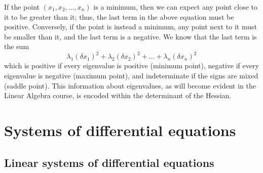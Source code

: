 \documentclass{article}
\begin{document}
If the point $(x_1, x_2, ..., x_n)$ is a minimum, then we can expect any point close to it to be greater than it; thus, the last term in the above equation must be positive. Conversely, if the point is instead a minimum, any point next to it must be smaller than it, and the last term is a negative. We know that the last term is the sum
\begin{equation*}
    \lambda_1(\delta x_1)^2+\lambda_2(\delta x_2)^2 + \dots + \lambda_n(\delta x_n)^2
\end{equation*}
which is positive if every eigenvalue is positive (minimum point), negative if every eigenvalue is negative (maximum point), and indeterminate if the signs are mixed (saddle point). This information about eigenvalues, as will become evident in the Linear Algebra course, is encoded within the determinant of the Hessian.
\newpage
\section{Systems of differential equations}
\subsection{Linear systems of differential equations}
\end{document}
